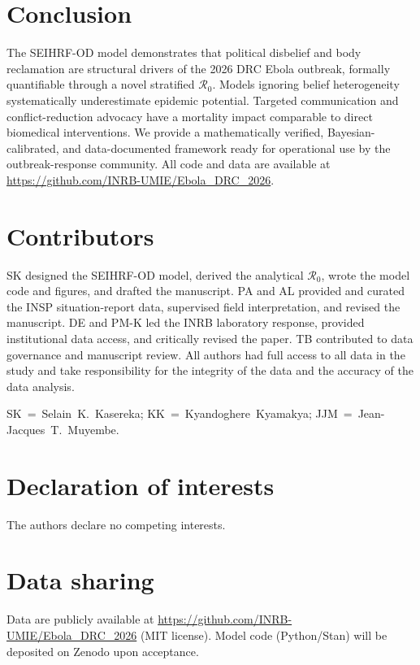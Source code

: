 \documentclass[12pt,a4paper]{article}
\begin{document}
\section{Conclusion}

The SEIHRF-OD model demonstrates that political disbelief and body reclamation
are structural drivers of the 2026 DRC Ebola outbreak, formally
quantifiable through a novel stratified $\mathcal{R}_0$. Models ignoring
belief heterogeneity systematically underestimate epidemic potential.
Targeted communication and conflict-reduction advocacy have a mortality impact
comparable to direct biomedical interventions. We provide a
mathematically verified, Bayesian-calibrated, and data-documented framework
ready for operational use by the outbreak-response community. All code and
data are available at \url{https://github.com/INRB-UMIE/Ebola_DRC_2026}.

\section*{Contributors}
SK designed the SEIHRF-OD model, derived the analytical $\mathcal{R}_0$,
wrote the model code and figures, and drafted the manuscript. PA and AL
provided and curated the INSP situation-report data, supervised field
interpretation, and revised the manuscript. DE and PM-K led the INRB
laboratory response, provided institutional data access, and critically
revised the paper. TB contributed to data governance and manuscript review.
All authors had full access to all data in the study and take
responsibility for the integrity of the data and the accuracy of the
data analysis.

\smallskip\noindent SK~=~Selain~K.~Kasereka;
KK~=~Kyandoghere~Kyamakya;
JJM~=~Jean-Jacques~T.~Muyembe.

\section*{Declaration of interests}
The authors declare no competing interests.

\section*{Data sharing}
Data are publicly available at
\url{https://github.com/INRB-UMIE/Ebola_DRC_2026} (MIT license). Model
code (Python/Stan) will be deposited on Zenodo upon acceptance.
\end{document}
